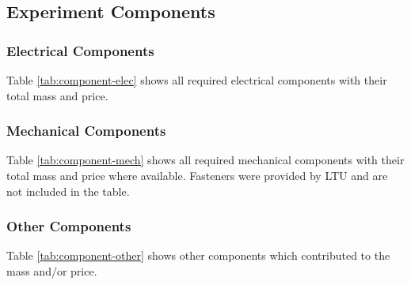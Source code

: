 \begin{landscape}
\subsection{Experiment Components} \label{components}
\label{sec:experiment-components}

\subsubsection{Electrical Components}
Table \ref{tab:component-elec} shows all required electrical components with their total mass and price.\\


    \end{landscape}

\begin{landscape}

\subsubsection{Mechanical Components}
Table \ref{tab:component-mech} shows all required mechanical components with their total mass and price where available. Fasteners were provided by LTU and are not included in the table. \\


\raggedbottom
\end{landscape}

\begin{landscape}
\subsubsection{Other Components}
Table \ref{tab:component-other} shows other components which contributed to the mass and/or price.\\



\raggedbottom
\end{landscape}